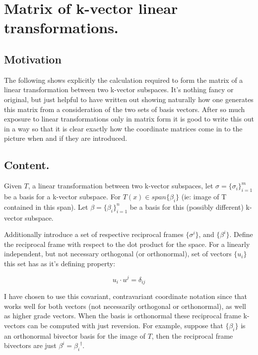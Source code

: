 \chapter{Matrix of k-vector linear transformations.}


\section{Motivation }

The following shows explicitly the calculation required to form the matrix of a linear transformation between two k-vector subspaces.  It's nothing fancy or original, but just helpful
to have written out showing naturally how one generates this matrix from a consideration of the two sets of basis vectors.  After so much exposure to linear transformations only in matrix
form it is good to write this out in a way so that it is clear exactly how the coordinate matrices come in to the picture when and if they are introduced.

\section{Content. }

Given $T$, a linear transformation between two k-vector subspaces,
let $\sigma = \{\sigma_i\}_{i=1}^m$ be a basis for a k-vector subspace.
For $T(x) \in span\{ \beta_i \}$ (ie: image of T contained in this span).  Let $\beta = \{\beta_i\}_{i=1}^n$ be a basis for this (possibly different) k-vector subspace.

Additionally introduce a set of respective reciprocal frames $\{\sigma^i\}$, and $\{\beta^i\}$.
Define the reciprocal frame with respect to the dot product for the space.  For a linearly independent, but not necessary orthogonal (or orthonormal), set of vectors $\{u_i\}$ this set 
has as it's defining property:

\[
u_i \cdot u^j = \delta_{ij}
\]

I have chosen to use this covariant, contravariant coordinate notation since that works well for both vectors (not necessarily orthogonal or orthonormal), as well as higher grade vectors.  When the basis is orthonormal these reciprocal frame k-vectors can be computed with just reversion.  For example, suppose that $\{\beta_i\}$ is an orthonormal bivector basis for the image of $T$, then the reciprocal frame bivectors are just $\beta^i = {\beta_i}^\dagger$.

